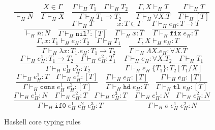 \begin{figure}
\[
\frac{}{\vdash_{H}N}
\quad
\frac{X\in\Gamma}{\Gamma\vdash_{H}X}
\quad
\frac{\Gamma\vdash_{H}T_{1}\quad\Gamma\vdash_{H}T_{2}}{\Gamma\vdash_{H}T_{1}\rightarrow T_{2}}
\quad
\frac{\Gamma ,X\vdash_{H}T}{\Gamma\vdash_{H}\forall X.T}
\quad
\frac{\Gamma\vdash_{H}T}{\Gamma\vdash_{H}[T]}
\]
\bigskip
\[
\frac{}{\vdash_{H}\overline{n}:N}
\quad
\frac{\Gamma\vdash_{H}T}{\Gamma\vdash_{H}\mathtt{nil}^{T}:[T]}
\quad
\frac{x:T\in\Gamma}{\Gamma\vdash_{H}x:T}
\quad
\frac{\Gamma\vdash_{H}e_{H}:T\rightarrow T}{\Gamma\vdash_{H}\mathtt{fix}\;e_{H}:T}
\]
\[
\frac{\Gamma,x:T_{1}\vdash_{H}e_{H}:T_{2}\quad\Gamma\vdash_{H}T_{1}}{\Gamma\vdash_{H}\lambda x:T_{1}.e_{H}:T_{1}\rightarrow T_{2}}
\quad
\frac{\Gamma,X\vdash_{H}e_{H}:T}{\Gamma\vdash_{H}\Lambda X.e_{H}:\forall X.T}
\]
\[
\frac{\Gamma\vdash_{H}e_{H}^{1}:T_{1}\rightarrow T_{2}\quad\Gamma\vdash_{H}e_{H}^{2}:T_{1}}{\Gamma\vdash_{H}e_{H}^{1}\;e_{H}^{2}:T_{2}}
\quad
\frac{\Gamma\vdash_{H}e_{H}:\forall X.T_{2}\quad\Gamma\vdash_{H}T_{1}}{\Gamma\vdash_{H}e_{H}\;\lbrace T_{1}\rbrace:T_{2}[T_{1}/X]}
\]
\[
\frac{\Gamma\vdash_{H}e_{H}^{1}:T\quad\Gamma\vdash_{H}e_{H}^{2}:[T]}{\Gamma\vdash_{H}\mathtt{cons}\;e_{H}^{1}\;e_{H}^{2}:[T]}
\quad
\frac{\Gamma\vdash_{H}e_{H}:[T]}{\Gamma\vdash_{H}\mathtt{hd}\;e_{H}:T}
\quad
\frac{\Gamma\vdash_{H}e_{H}:[T]}{\Gamma\vdash_{H}\mathtt{tl}\;e_{H}:[T]}
\]
\[
\frac{\Gamma\vdash_{H}e_{H}^{1}:N\quad\Gamma\vdash_{H}e_{H}^{2}:T\quad\Gamma\vdash_{H}e_{H}^{3}:T}{\Gamma\vdash_{H}\mathtt{if0}\;e_{H}^{1}\;e_{H}^{2}\;e_{H}^{3}:T}
\quad
\frac{\Gamma\vdash_{H}e_{H}^{1}:N\quad\Gamma\vdash_{H}e_{H}^{2}:N}{\Gamma\vdash_{H}o\;e_{H}^{1}\;e_{H}^{2}:N}
\]
\caption{Haskell core typing rules}
\label{hctr}
\end{figure}